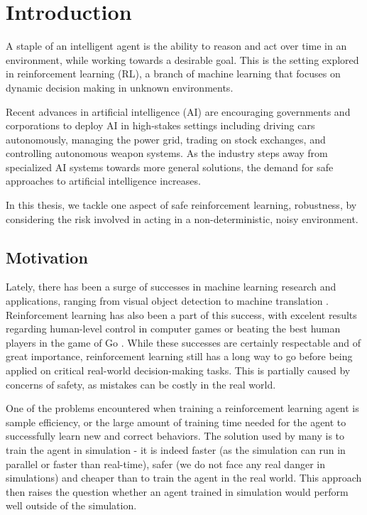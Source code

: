 \chapter{Introduction}\label{ch:intro}

A staple of an intelligent agent is the ability to reason and act over time in an environment, while working towards a desirable goal. This is the setting explored in reinforcement learning (RL), a branch of machine learning that focuses on dynamic decision making in unknown environments.

Recent advances in artificial intelligence (AI) are encouraging governments and corporations to deploy AI in high-stakes settings including driving cars autonomously, managing the power grid, trading on stock exchanges, and controlling autonomous weapon systems. As the industry steps away from specialized AI systems towards more general solutions, the demand for safe approaches to artificial intelligence increases.

In this thesis, we tackle one aspect of safe reinforcement learning, robustness, by considering the risk involved in acting in a non-deterministic, noisy environment.

\section{Motivation}\label{sec:intro:motivation}

Lately, there has been a surge of successes in machine learning research and applications, ranging from visual object detection \cite{krizhevsky2012imagenet} to machine translation \citep{bahdanau2014neural}. Reinforcement learning has also been a part of this success, with excelent results regarding human-level control in computer games \cite{mnih2015human} or beating the best human players in the game of Go \citep{silver2017mastering}. While these successes are certainly respectable and of great importance, reinforcement learning still has a long way to go before being applied on critical real-world decision-making tasks. This is partially caused by concerns of safety, as mistakes can be costly in the real world.

One of the problems encountered when training a reinforcement learning agent is sample efficiency, or the large amount of training time needed for the agent to successfully learn new and correct behaviors. The solution used by many is to train the agent in simulation - it is indeed faster (as the simulation can run in parallel or faster than real-time), safer (we do not face any real danger in simulations) and cheaper than to train the agent in the real world.
This approach then raises the question whether an agent trained in simulation would perform well outside of the simulation.

